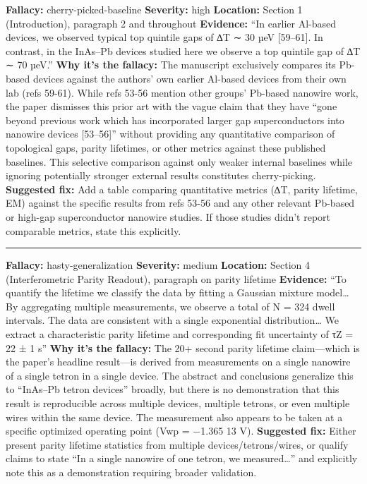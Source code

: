\documentclass[10pt,letterpaper]{article}
\begin{document}
\textbf{Fallacy:} cherry-picked-baseline
\textbf{Severity:} high
\textbf{Location:} Section 1 (Introduction), paragraph 2 and throughout
\textbf{Evidence:} ``In earlier Al-based devices, we observed typical top quintile gaps of ∆T ∼ 30 µeV {[}59--61{]}. In contrast, in the InAs--Pb devices studied here we observe a top quintile gap of ∆T ∼ 70 µeV.''
\textbf{Why it's the fallacy:} The manuscript exclusively compares its Pb-based devices against the authors' own earlier Al-based devices from their own lab (refs 59-61). While refs 53-56 mention other groups' Pb-based nanowire work, the paper dismisses this prior art with the vague claim that they have ``gone beyond previous work which has incorporated larger gap superconductors into nanowire devices {[}53--56{]}'' without providing any quantitative comparison of topological gaps, parity lifetimes, or other metrics against these published baselines. This selective comparison against only weaker internal baselines while ignoring potentially stronger external results constitutes cherry-picking.
\textbf{Suggested fix:} Add a table comparing quantitative metrics (∆T, parity lifetime, EM) against the specific results from refs 53-56 and any other relevant Pb-based or high-gap superconductor nanowire studies. If those studies didn't report comparable metrics, state this explicitly.

\begin{center}\rule{0.5\linewidth}{0.5pt}\end{center}

\textbf{Fallacy:} hasty-generalization
\textbf{Severity:} medium
\textbf{Location:} Section 4 (Interferometric Parity Readout), paragraph on parity lifetime
\textbf{Evidence:} ``To quantify the lifetime we classify the data by fitting a Gaussian mixture model\ldots{} By aggregating multiple measurements, we observe a total of N = 324 dwell intervals. The data are consistent with a single exponential distribution\ldots{} We extract a characteristic parity lifetime and corresponding fit uncertainty of τZ = 22 ± 1 s''
\textbf{Why it's the fallacy:} The 20+ second parity lifetime claim---which is the paper's headline result---is derived from measurements on a single nanowire of a single tetron in a single device. The abstract and conclusions generalize this to ``InAs--Pb tetron devices'' broadly, but there is no demonstration that this result is reproducible across multiple devices, multiple tetrons, or even multiple wires within the same device. The measurement also appears to be taken at a specific optimized operating point (Vwp = −1.365 13 V).
\textbf{Suggested fix:} Either present parity lifetime statistics from multiple devices/tetrons/wires, or qualify claims to state ``In a single nanowire of one tetron, we measured\ldots{}'' and explicitly note this as a demonstration requiring broader validation.
\end{document}
